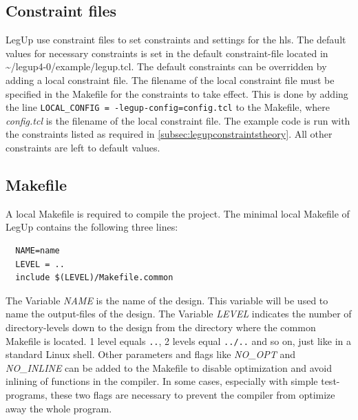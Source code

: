 \subsection{Constraint files}
LegUp use constraint files to set constraints and settings for the \gls{hls}. The default values for necessary constraints is set in the default constraint-file located in \textasciitilde/legup4-0/example/legup.tcl. The default constraints can be overridden by adding a local constraint file. The filename of the local constraint file must be specified in the Makefile for the constraints to take effect. This is done by adding the line \verb!LOCAL_CONFIG = -legup-config=config.tcl! to the Makefile, where \textit{config.tcl} is the filename of the local constraint file. The example code is run with the constraints listed as required in \cref{subsec:legupconstraintstheory}. All other constraints are left to default values.
\subsection{Makefile}
A local Makefile is required to compile the project. The minimal local Makefile of LegUp contains the following three lines:
\begin{verbatim}
  NAME=name
  LEVEL = ..
  include $(LEVEL)/Makefile.common
\end{verbatim}

The Variable \textit{NAME} is the name of the design. This variable will be used to name the output-files of the design. The Variable \textit{LEVEL} indicates the number of directory-levels down to the design from the directory where the common Makefile is located. 1 level equals \verb!..!, 2 levels equal \verb!../..! and so on, just like in a standard Linux shell. Other parameters and flags like \textit{NO\_OPT} and \textit{NO\_INLINE} can be added to the Makefile to disable optimization and avoid inlining of functions in the compiler. In some cases, especially with simple test-programs, these two flags are necessary to prevent the compiler from optimize away the whole program.
